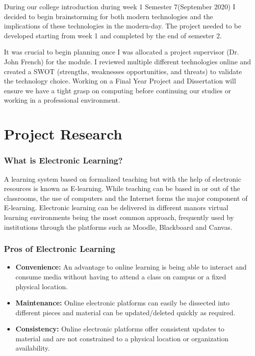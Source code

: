 

During our college introduction during week 1 Semester 7(September 2020)  I decided to begin brainstorming for both modern technologies and the implications of these technologies in the modern-day. The project needed to be developed starting from week 1 and completed by the end of semester 2.

It was crucial to begin planning once I was allocated  a project supervisor (Dr. John French) for the module. I reviewed multiple different technologies online and created a SWOT (strengths, weaknesses opportunities, and threats) to validate  the technology choice. Working on a Final Year Project and Dissertation will ensure we have a tight grasp on computing before continuing our studies or working in a professional environment.\\

\chapter{Project Research}


    \subsection{What is Electronic Learning?}

A learning system based on formalized teaching but with the help of electronic resources is known as E-learning. While teaching can be based in or out of the classrooms, the use of computers and the Internet forms the major component of E-learning. Electronic learning can be delivered in different manors virtual learning environments being the most common approach, frequently  used by institutions through the platforms such as  Moodle, Blackboard and Canvas.




    \subsection{Pros of Electronic Learning}
    \begin{itemize}
  \item   \textbf{Convenience:}  An advantage to online learning is being able to interact and consume media without having to attend a class on campus or a fixed physical location.
  
    \item   \textbf{Maintenance:}  Online electronic platforms can easily be dissected into different pieces and material can be updated/deleted quickly as  required.
    
    \item   \textbf{Consistency:} Online electronic platforms offer consistent updates to material and are not constrained to a physical location or organization availability.
    
\end{itemize}
    
